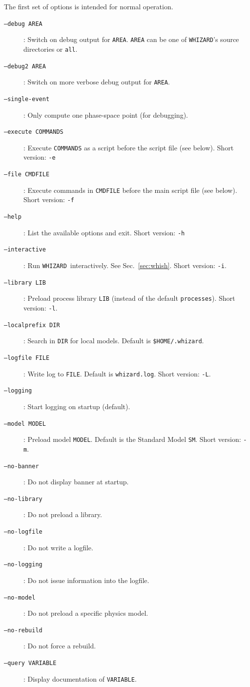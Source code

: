 \documentclass[12pt]{book}
\newcommand{\ttt}[1]{\texttt{#1}}
\newcommand{\whizard}{\ttt{WHIZARD}}
\begin{document}
The first set of options is intended for normal operation.
\begin{description}
\item[\ttt{--debug AREA}]: Switch on debug output for \ttt{AREA}.
  \ttt{AREA} can be one of \whizard's source directories or \ttt{all}.
\item[\ttt{--debug2 AREA}]: Switch on more verbose debug output for \ttt{AREA}.
\item[\ttt{--single-event}]: Only compute one phase-space point (for debugging).
\item[\ttt{--execute COMMANDS}]:  Execute \ttt{COMMANDS} as a script
  before the script file (see below).  Short version: \ttt{-e}
\item[\ttt{--file CMDFILE}]:  Execute commands in \ttt{CMDFILE} before the
  main script file (see below).  Short version: \ttt{-f}
\item[\ttt{--help}]:  List the available options and exit.  Short version:
  \ttt{-h}
\item[\ttt{--interactive}]:  Run \whizard\ interactively.  See
  Sec.~\ref{sec:whish}.  Short version: \ttt{-i}.
\item[\ttt{--library LIB}]:  Preload process library \ttt{LIB}
  (instead of the default \ttt{processes}).  Short version: \ttt{-l}.
\item[\ttt{--localprefix DIR}]:  Search in \ttt{DIR} for local
  models.  Default is \ttt{\$HOME/.whizard}.
\item[\ttt{--logfile \ttt{FILE}}]: Write log to \ttt{FILE}.  Default is
  \ttt{whizard.log}.  Short version: \ttt{-L}.
\item[\ttt{--logging}]: Start logging on startup (default).
\item[\ttt{--model MODEL}]: Preload model \ttt{MODEL}.  Default is the
  Standard Model \ttt{SM}.  Short version: \ttt{-m}.
\item[\ttt{--no-banner}]: Do not display banner at startup.
\item[\ttt{--no-library}]: Do not preload a library.
\item[\ttt{--no-logfile}]: Do not write a logfile.
\item[\ttt{--no-logging}]: Do not issue information into the logfile.
\item[\ttt{--no-model}]: Do not preload a specific physics model.
\item[\ttt{--no-rebuild}]: Do not force a rebuild.
\item[\ttt{--query VARIABLE}]: Display documentation of \ttt{VARIABLE}.

\end{description}
\end{document}
